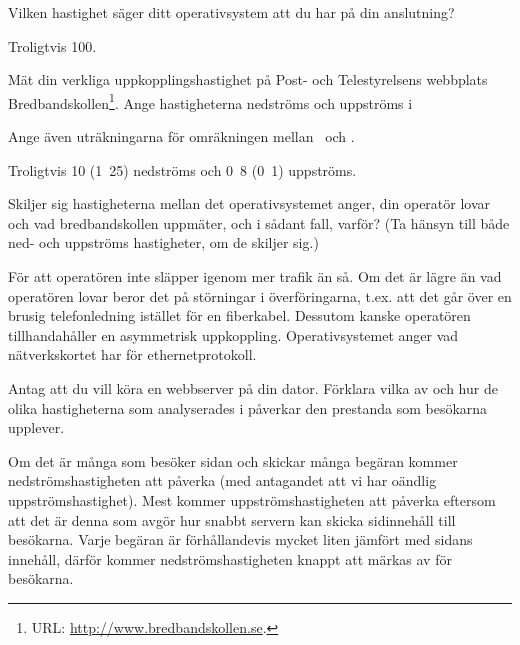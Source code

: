 \documentclass[11pt,a4paper]{miunasgn}
\newcommand{\Mbps}{\mega\bit\per\second}
\newcommand{\MBps}{\mega\byte\per\second}
\begin{document}
\begin{questions}
\question
Vilken hastighet säger ditt operativsystem att du har på din anslutning?
\begin{solution}
	Troligtvis \unit{100}{\Mbps}.
\end{solution}

\question
Mät din verkliga uppkopplingshastighet på Post- och Telestyrelsens webbplats
Bredbandskollen\footnote{URL: \url{http://www.bredbandskollen.se}.}.
Ange hastigheterna nedströms och uppströms i
Ange även uträkningarna för omräkningen mellan \Mbps\ och \MBps.
\begin{solution}
	Troligtvis \unit{10}{\Mbps} (\unit{1.25}{\MBps}) nedströms och
	\unit{0.8}{\Mbps} (\unit{0.1}{\MBps}) uppströms.
\end{solution}

\question\label{q:AnalyseraUppkoppplingshastigheter}
Skiljer sig hastigheterna mellan det operativsystemet anger, din operatör lovar
och vad bredbandskollen uppmäter, och i sådant fall, varför? (Ta hänsyn till
både ned- och uppströms hastigheter, om de skiljer sig.)
\begin{solution}
	För att operatören inte släpper igenom mer trafik än så.
	Om det är lägre än vad operatören lovar beror det på störningar i
	överföringarna, t.ex. att det går över en brusig telefonledning istället
	för en fiberkabel.
	Dessutom kanske operatören tillhandahåller en asymmetrisk uppkoppling.
	Operativsystemet anger vad nätverkskortet har för ethernetprotokoll.
\end{solution}

\question
Antag att du vill köra en webbserver på din dator.
Förklara vilka av och hur de olika hastigheterna som analyserades i
 påverkar den prestanda som
besökarna upplever.
\begin{solution}
	Om det är många som besöker sidan och skickar många begäran kommer
	nedströmshastigheten att påverka (med antagandet att vi har oändlig
	uppströmshastighet).
	Mest kommer uppströmshastigheten att påverka eftersom att det är denna som
	avgör hur snabbt servern kan skicka sidinnehåll till besökarna.
	Varje begäran är förhållandevis mycket liten jämfört med sidans innehåll,
	därför kommer nedströmshastigheten knappt att märkas av för besökarna.
\end{solution}


\end{questions}
\end{document}
